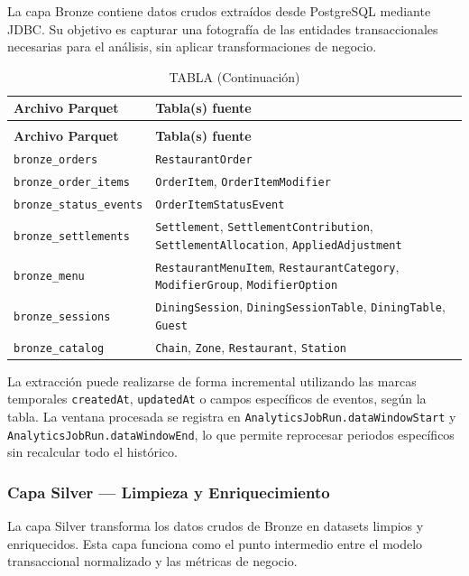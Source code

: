 La capa Bronze contiene datos crudos extraídos desde PostgreSQL mediante JDBC. Su objetivo
es capturar una fotografía de las entidades transaccionales necesarias para el análisis,
sin aplicar transformaciones de negocio.

\begin{longtable}{p{6cm}p{10cm}}
\caption{Fuentes de datos para la capa Bronze} \label{tab:bronze_sources} \\
\hline
\textbf{Archivo Parquet} & \textbf{Tabla(s) fuente} \\
\hline
\endfirsthead
\caption[]{TABLA \thetable{} (Continuación)} \\
\hline
\textbf{Archivo Parquet} & \textbf{Tabla(s) fuente} \\
\hline
\endhead
\hline
\endfoot
\texttt{bronze\_orders} &
\texttt{RestaurantOrder} \\
\hline
\texttt{bronze\_order\_items} &
\texttt{OrderItem}, \texttt{OrderItemModifier} \\
\hline
\texttt{bronze\_status\_events} &
\texttt{OrderItemStatusEvent} \\
\hline
\texttt{bronze\_settlements} &
\texttt{Settlement}, \texttt{SettlementContribution}, \texttt{SettlementAllocation},
\texttt{AppliedAdjustment} \\
\hline
\texttt{bronze\_menu} &
\texttt{RestaurantMenuItem}, \texttt{RestaurantCategory}, \texttt{ModifierGroup},
\texttt{ModifierOption} \\
\hline
\texttt{bronze\_sessions} &
\texttt{DiningSession}, \texttt{DiningSessionTable}, \texttt{DiningTable}, \texttt{Guest} \\
\hline
\texttt{bronze\_catalog} &
\texttt{Chain}, \texttt{Zone}, \texttt{Restaurant}, \texttt{Station} \\
\hline
\end{longtable}

La extracción puede realizarse de forma incremental utilizando las marcas temporales
\texttt{createdAt}, \texttt{updatedAt} o campos específicos de eventos, según la tabla.
La ventana procesada se registra en \texttt{AnalyticsJobRun.dataWindowStart} y
\texttt{AnalyticsJobRun.dataWindowEnd}, lo que permite reprocesar periodos específicos
sin recalcular todo el histórico.

\subsubsection{Capa Silver --- Limpieza y Enriquecimiento}

La capa Silver transforma los datos crudos de Bronze en datasets limpios y enriquecidos.
Esta capa funciona como el punto intermedio entre el modelo transaccional normalizado y
las métricas de negocio.

